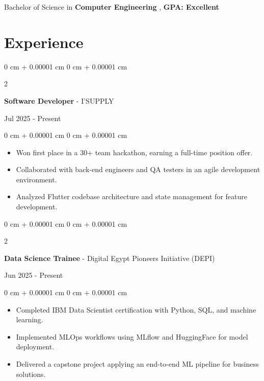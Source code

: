\documentclass[10pt, letterpaper]{article}
\newenvironment{highlights}{
\begin{itemize}[
topsep=0.10 cm,
parsep=0.10 cm,
partopsep=0pt,
itemsep=0pt,
leftmargin=0 cm + 10pt
]
}{
\end{itemize}
} %
\newenvironment{onecolentry}{
\begin{adjustwidth}{
0 cm + 0.00001 cm
}{
0 cm + 0.00001 cm
}
}{
\end{adjustwidth}
} %
\newenvironment{twocolentry}[2][]{
\onecolentry
\def\secondColumn{#2}
\setcolumnwidth{\fill, 4.5 cm}
\begin{paracol}{2}
}{
\switchcolumn \raggedleft \secondColumn
\end{paracol}
\endonecolentry
} %
\begin{document}
\vspace{0.10cm}

Bachelor of Science in \textbf{Computer Engineering} , \textbf{GPA: Excellent}




\section{Experience}
\vspace{0.2cm}
\begin{twocolentry}{
Jul 2025 - Present
}
\textbf{\large Software Developer} - I'SUPPLY
\end{twocolentry}
\vspace{0.1 cm}

\begin{onecolentry}
\begin{highlights}
\item Won first place in a 30+ team hackathon, earning a full-time position offer.
\item Collaborated with back-end engineers and QA testers in an agile development environment.
\item Analyzed Flutter codebase architecture and state management for feature development.
\end{highlights}
\end{onecolentry}

\vspace{0.1cm}

\begin{twocolentry}{
Jun 2025 - Present
}
\textbf{\large Data Science Trainee} - Digital Egypt Pioneers Initiative (DEPI)
\end{twocolentry}

\vspace{0.1cm}

\begin{onecolentry}
\begin{highlights}
\item Completed IBM Data Scientist certification with Python, SQL, and machine learning.
\item Implemented MLOps workflows using MLflow and HuggingFace for model deployment.
\item Delivered a capstone project applying an end-to-end ML pipeline for business solutions.
\end{highlights}
\end{onecolentry}

\vspace{0.1cm}
\end{document}
